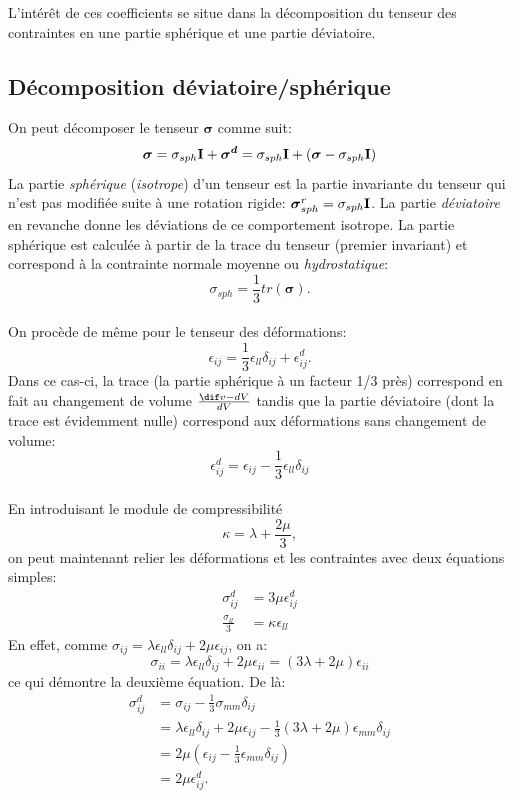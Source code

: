 L'intérêt de ces coefficients se situe dans la décomposition du tenseur des contraintes en une partie sphérique et une partie déviatoire.

\subsection{Décomposition déviatoire/sphérique}
On peut décomposer le tenseur $\boldsymbol{\sigma}$ comme suit:
$$\boldsymbol{\sigma}=\sigma_{sph}\textbf{I}+\boldsymbol{\sigma^d}=\sigma_{sph}\textbf{I}+(\boldsymbol{\sigma}-\sigma_{sph}\textbf{I})$$
La partie \emph{sphérique} (\emph{isotrope}) d'un tenseur est la partie invariante du tenseur qui n'est pas modifiée suite à une rotation rigide: $\boldsymbol{\sigma}_{sph}^r=\sigma_{sph}\textbf{I}$. La partie \emph{déviatoire} en revanche donne les déviations de ce comportement isotrope.
La partie sphérique est calculée à partir de la trace du tenseur (premier invariant) et correspond à la contrainte normale moyenne ou \emph{hydrostatique}:
$$\sigma_{sph}=\frac{1}{3}tr(\boldsymbol{\sigma}).$$
\paragraph{}
On procède de même pour le tenseur des déformations:
$$\epsilon_{ij}=\frac{1}{3}\epsilon_{ll}\delta_{ij}+\epsilon_{ij}^d.$$ Dans ce cas-ci, la trace (la partie sphérique à un facteur 1/3 près) correspond en fait au changement de volume $\frac{ \dif v-dV}{dV}$ tandis que la partie déviatoire (dont la trace est évidemment nulle) correspond aux déformations sans changement de volume:
$$\epsilon_{ij}^d=\epsilon_{ij}-\frac{1}{3}\epsilon_{ll}\delta_{ij}$$
\paragraph{}
En introduisant le module de compressibilité $$\kappa=\lambda+\frac{2\mu}{3},$$ on peut maintenant relier les déformations et les contraintes avec deux équations simples:
\begin{align}
\label{defo-cont}
\sigma_{ij}^d&=3\mu\epsilon_{ij}^d\\
\frac{\sigma_{ll}}{3}&=\kappa\epsilon_{ll}
\end{align}
En effet, comme $\sigma_{ij}=\lambda\epsilon_{ll}\delta_{ij}+2\mu\epsilon_{ij}$, on a:
$$\sigma_{ii}=\lambda\epsilon_{ll}\delta_{ij}+2\mu\epsilon_{ii}=(3\lambda+2\mu)\epsilon_{ii}$$ ce qui démontre la deuxième équation. De là:
\begin{align*}
\sigma_{ij}^d&=\sigma_{ij}-\frac{1}{3}\sigma_{mm}\delta_{ij}\\
 &=\lambda\epsilon_{ll}\delta_{ij}+2\mu\epsilon_{ij}-\frac{1}{3}(3\lambda+2\mu)\epsilon_{mm}\delta_{ij}\\
 &=2\mu(\epsilon_{ij}-\frac{1}{3}\epsilon_{mm}\delta_{ij})\\
 &=2\mu\epsilon_{ij}^d.\\
\end{align*}

